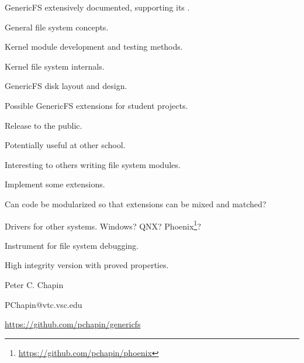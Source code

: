 \documentclass[landscape]{slides}
\begin{document}

GenericFS extensively documented, supporting its .

\begin{citemize}
\item General file system concepts.
\item Kernel module development and testing methods.
\item Kernel file system internals.
\item GenericFS disk layout and design.
\item Possible GenericFS extensions for student projects.
\end{citemize}
\stopslide


\begin{citemize}
\item Release to the public.
\begin{citemize}
\item Potentially useful at other school.
\item Interesting to others writing file system modules.
\end{citemize}

\item Implement some extensions.
\begin{citemize}
\item Can code be modularized so that extensions can be mixed and matched?
\end{citemize}

\item Drivers for other systems. Windows? QNX?
  Phoenix\footnote{\url{https://github.com/pchapin/phoenix}}?
\item Instrument for file system debugging.
\item High integrity version with proved properties.
\end{citemize}
\stopslide


\centerline{Peter C. Chapin}
\makeatletter
\centerline{PChapin@vtc.vsc.edu}
\makeatother
\centerline{\url{https://github.com/pchapin/genericfs}}
\stopslide
\end{document}
